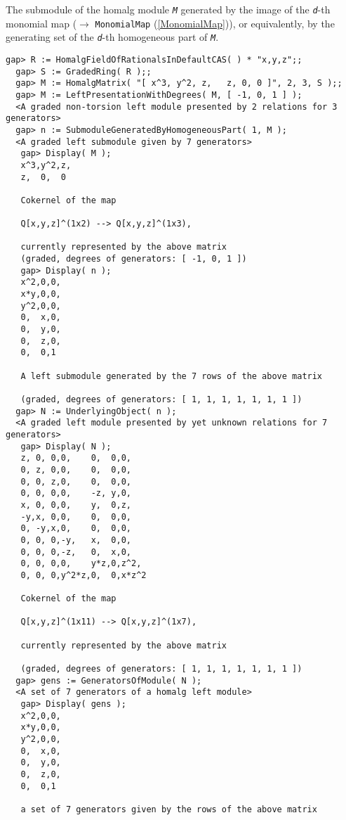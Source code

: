 \documentclass[a4paper,11pt]{report}
\begin{document}
{{{ The submodule of the \textsf{homalg} module \mbox{\texttt{\slshape M}} generated by the image of the \mbox{\texttt{\slshape d}}-th monomial map ($\to$ \texttt{MonomialMap} (\ref{MonomialMap})), or equivalently, by the generating set of the \mbox{\texttt{\slshape d}}-th homogeneous part of \mbox{\texttt{\slshape M}}. 
\begin{Verbatim}[fontsize=\small,frame=single,label=Example]
  gap> R := HomalgFieldOfRationalsInDefaultCAS( ) * "x,y,z";;
  gap> S := GradedRing( R );;
  gap> M := HomalgMatrix( "[ x^3, y^2, z,   z, 0, 0 ]", 2, 3, S );;
  gap> M := LeftPresentationWithDegrees( M, [ -1, 0, 1 ] );
  <A graded non-torsion left module presented by 2 relations for 3 generators>
  gap> n := SubmoduleGeneratedByHomogeneousPart( 1, M );
  <A graded left submodule given by 7 generators>
   gap> Display( M );
   x^3,y^2,z,
   z,  0,  0 
   
   Cokernel of the map
   
   Q[x,y,z]^(1x2) --> Q[x,y,z]^(1x3),
   
   currently represented by the above matrix
   (graded, degrees of generators: [ -1, 0, 1 ])
   gap> Display( n );
   x^2,0,0,
   x*y,0,0,
   y^2,0,0,
   0,  x,0,
   0,  y,0,
   0,  z,0,
   0,  0,1 
   
   A left submodule generated by the 7 rows of the above matrix
   
   (graded, degrees of generators: [ 1, 1, 1, 1, 1, 1, 1 ])
  gap> N := UnderlyingObject( n );
  <A graded left module presented by yet unknown relations for 7 generators>
   gap> Display( N );
   z, 0, 0,0,    0,  0,0,   
   0, z, 0,0,    0,  0,0,   
   0, 0, z,0,    0,  0,0,   
   0, 0, 0,0,    -z, y,0,   
   x, 0, 0,0,    y,  0,z,   
   -y,x, 0,0,    0,  0,0,   
   0, -y,x,0,    0,  0,0,   
   0, 0, 0,-y,   x,  0,0,   
   0, 0, 0,-z,   0,  x,0,   
   0, 0, 0,0,    y*z,0,z^2, 
   0, 0, 0,y^2*z,0,  0,x*z^2
   
   Cokernel of the map
   
   Q[x,y,z]^(1x11) --> Q[x,y,z]^(1x7),
   
   currently represented by the above matrix
   
   (graded, degrees of generators: [ 1, 1, 1, 1, 1, 1, 1 ])
  gap> gens := GeneratorsOfModule( N );
  <A set of 7 generators of a homalg left module>
   gap> Display( gens );
   x^2,0,0,
   x*y,0,0,
   y^2,0,0,
   0,  x,0,
   0,  y,0,
   0,  z,0,
   0,  0,1 
   
   a set of 7 generators given by the rows of the above matrix
\end{Verbatim}
 }

}}
\end{document}
